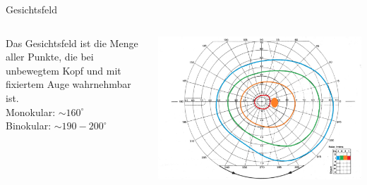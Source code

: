 \documentclass{beamer}
\begin{document}

\begin{frame}{Gesichtsfeld}

\begin{columns}[c]

\begin{column}{5cm}
    Das Gesichtsfeld ist die Menge aller Punkte, die bei unbewegtem Kopf und mit fixiertem Auge wahrnehmbar ist. \\
    
Monokular: \(\sim 160^{\circ}\) \\
Binokular: \(\sim 190-200^{\circ}\) \\
\end{column}


\begin{column}{5cm}
\begin{center}
\includegraphics[width=\textwidth]{Goldmann_visual_field_record_sheet.jpg}
\end{center}
\end{column}

\end{columns}

    
\end{frame}
\end{document}

